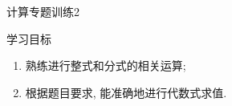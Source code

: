 \documentclass[10pt,twoside,fleqn]{ctexart}
\renewcommand*{\ge}{\geqslant}
\begin{document}
\begin{center}
{\kaishu{}计算专题训练2}
\end{center}


{\heiti 学习目标}
\begin{enumerate}
\item
熟练进行整式和分式的相关运算;

\item
根据题目要求, 能准确地进行代数式求值.
\end{enumerate}









\end{document}
